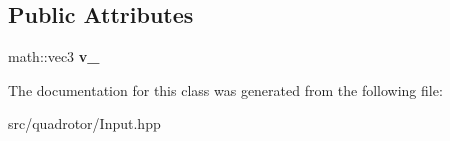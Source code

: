 \subsection*{\-Public \-Attributes}
\begin{DoxyCompactItemize}
\item 
\hypertarget{classInput_1_1Vec3_1_1Const_a3fa537d473ff297a1581031e0ba593b4}{math\-::vec3 {\bfseries v\-\_\-}}\label{classInput_1_1Vec3_1_1Const_a3fa537d473ff297a1581031e0ba593b4}

\end{DoxyCompactItemize}


\-The documentation for this class was generated from the following file\-:\begin{DoxyCompactItemize}
\item 
src/quadrotor/\-Input.\-hpp\end{DoxyCompactItemize}
